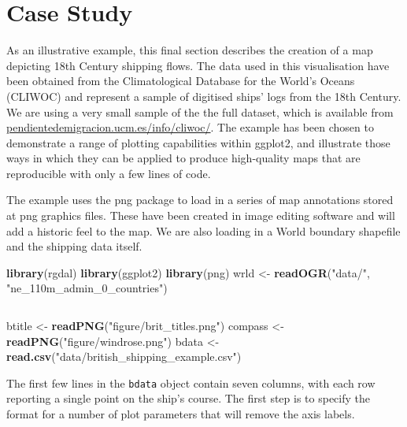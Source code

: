 \documentclass[]{article}
\newenvironment{Shaded}{}{}
\newcommand{\KeywordTok}[1]{\textcolor[rgb]{0.00,0.44,0.13}{\textbf{{#1}}}}
\newcommand{\StringTok}[1]{\textcolor[rgb]{0.25,0.44,0.63}{{#1}}}
\newcommand{\NormalTok}[1]{{#1}}
\begin{document}
\section{Case Study}
As an illustrative example, this final section describes the creation of a map depicting 18th Century shipping flows. The data used in this visualisation have been obtained from the Climatological Database for the World's Oceans (CLIWOC) and
represent a sample of digitised ships' logs from the 18th Century.
We are using a very small sample of the the full dataset, which is
available
from\\\href{http://pendientedemigracion.ucm.es/info/cliwoc/}{pendientedemigracion.ucm.es/info/cliwoc/}.
The example has been chosen to demonstrate a range of plotting capabilities
within ggplot2, and illustrate those ways in which they can be applied to produce
high-quality maps that are reproducible with only a few lines of code.

The example uses the png package to load in a series of map
annotations stored at png graphics files. These have been created in image editing software and will add a historic feel to the map. We are also loading in a World boundary
shapefile and the shipping data itself.

\begin{Shaded}
\begin{Highlighting}[]
\KeywordTok{library}\NormalTok{(rgdal)}
\KeywordTok{library}\NormalTok{(ggplot2)}
\KeywordTok{library}\NormalTok{(png)}
\NormalTok{wrld <- }\KeywordTok{readOGR}\NormalTok{(}\StringTok{"data/"}\NormalTok{, }\StringTok{"ne_110m_admin_0_countries"}\NormalTok{)}
\end{Highlighting}
\end{Shaded}
\begin{verbatim}

\end{verbatim}
\begin{Shaded}
\begin{Highlighting}[]
\NormalTok{btitle <- }\KeywordTok{readPNG}\NormalTok{(}\StringTok{"figure/brit_titles.png"}\NormalTok{)}
\NormalTok{compass <- }\KeywordTok{readPNG}\NormalTok{(}\StringTok{"figure/windrose.png"}\NormalTok{)}
\NormalTok{bdata <- }\KeywordTok{read.csv}\NormalTok{(}\StringTok{"data/british_shipping_example.csv"}\NormalTok{)}
\end{Highlighting}
\end{Shaded}

The first few lines in the \texttt{bdata} object contain seven columns, with each row reporting a single point on the
ship's course. The first step is to specify the format for a number of plot parameters that will remove the axis labels.
\end{document}
